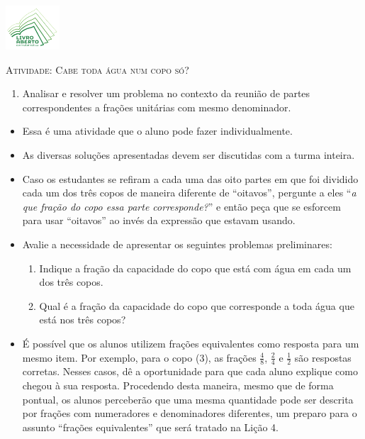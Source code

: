\documentclass[10 pt,usenames,dvipsnames, oneside]{article}
\begin{document}
\begin{center}
  \begin{minipage}[l]{3cm}
\includegraphics[width=2cm]{../../../Figuras/logo}       
\end{minipage}\hfill
\begin{minipage}[r]{.8\textwidth}
 {\Large \scshape Atividade: Cabe toda água num copo só?
}  
\end{minipage}
\end{center}
\vspace{.2cm}

\ifdefined\prof
\begin{goals}
\begin{enumerate}

    \item       Analisar e resolver um problema no contexto da reunião de partes correspondentes a frações unitárias com mesmo denominador.

\end{enumerate}
\tcblower

    \begin{itemize} %
    \item Essa é uma atividade que o aluno pode fazer individualmente.
    \item As diversas soluções apresentadas devem ser discutidas com a turma inteira.
    \item Caso os estudantes se refiram a cada uma das oito partes em que foi dividido cada um dos três copos de maneira diferente de ``oitavos'', pergunte a eles ``\textit{a que fração do copo essa parte corresponde?}'' e então peça que se esforcem para usar ``oitavos'' ao invés da expressão que estavam usando.
    \item Avalie a necessidade de apresentar os seguintes problemas preliminares:
      \begin{enumerate}
      \item Indique a fração da capacidade do copo que está com água em cada um dos três copos.
      \item Qual é a fração da capacidade do copo que corresponde a toda água que está nos três copos?
      \end{enumerate}
    \item É possível que os alunos utilizem frações equivalentes como resposta para um mesmo item. Por exemplo, para o copo (3), as frações $\frac{4}{8}$, $\frac{2}{4}$ e $\frac{1}{2}$ são respostas corretas. Nesses casos, dê a oportunidade para que cada aluno explique como chegou à sua resposta. Procedendo desta maneira, mesmo que de forma pontual, os alunos perceberão que uma mesma quantidade pode ser descrita por frações com numeradores e denominadores diferentes, um preparo para o assunto ``frações equivalentes'' que será tratado na Lição 4.
\end{itemize} %

\end{goals}
\end{document}
